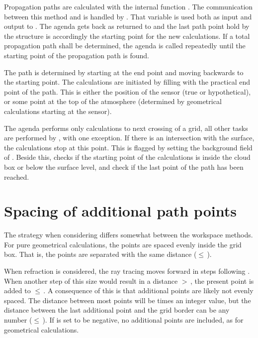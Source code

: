 Propagation paths are calculated with the internal function
. The communication between this method and
 is handled by .
That variable is used both as input and output to
.  The agenda gets back
 as returned to  and the
last path point hold by the structure is accordingly the starting
point for the new calculations. If a total propagation path shall be
determined, the agenda is called repeatedly until the starting point
of the propagation path is found. 

The path is determined by starting at the end point and moving
backwards to the starting point. The calculations are initiated by
filling  with the practical end point of the
path. This is either the position of the sensor (true or
hypothetical), or some point at the top of the atmosphere (determined
by geometrical calculations starting at the sensor).

The agenda performs only calculations to next crossing of a grid, all
other tasks are performed by , with one exception.
If there is an intersection with the surface, the calculations stop at
this point. This is flagged by setting the background field of
. Beside this,  checks if
the starting point of the calculations is inside the cloud box or
below the surface level, and check if the last point of the path has
been reached. 



\section{Spacing of additional path points}
\label{sec:ppath:lmax}

The strategy when considering  differs somewhat between
the workspace methods. For pure geometrical calculations, the points are spaced
evenly inside the grid box. That is, the points are separated with the same
distance ($\leq$\,). 

When refraction is considered, the ray tracing moves forward in steps following
. When another step of this size would result in a
distance $>$\,, the present point is added to
$\leq$\,. A consequence of this is that additional
points are likely not evenly spaced. The distance between most points will be
 times an integer value, but the distance between
the last additional point and the grid border can be any number
($\leq$\,). If  is set to be
negative, no additional points are included, as for geometrical calculations.

